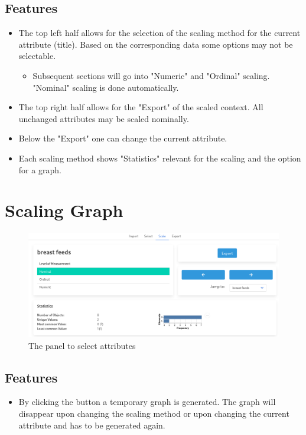 \documentclass[]{article}
\begin{document}
\subsection{Features}
\begin{itemize}
    \item The top left half allows for the selection of the scaling method for the current attribute (title). Based on the corresponding data some options may not be selectable.
    \begin{itemize}
        \item Subsequent sections will go into "Numeric" and "Ordinal" scaling. "Nominal" scaling is done automatically.
    \end{itemize}
    \item The top right half allows for the "Export" of the scaled context. All unchanged attributes may be scaled nominally.
    \item Below the "Export" one can change the current attribute.
    \item Each scaling method shows "Statistics" relevant for the scaling and the option for a graph.
\end{itemize}

\section{Scaling Graph}
\begin{figure}[H]
	\includegraphics[width=\linewidth]{images/nominal_graph.png}
	\caption{The panel to select attributes}
	\label{fig:p4}
\end{figure}
\subsection{Features}
\begin{itemize}
    \item By clicking the button a temporary graph is generated. The graph will disappear upon changing the scaling method or upon changing the current attribute and has to be generated again.
\end{itemize}
\end{document}
